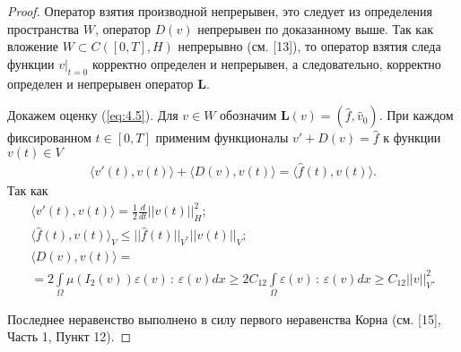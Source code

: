 \documentclass[14pt, a4paper]{extarticle}
\numberwithin{equation}{section}
\begin{document}
    \begin{proof}
        Оператор взятия производной непрерывен, это следует из определения пространства $W$, оператор $D(v)$
        непрерывен по доказанному выше. Так как вложение $W \subset C([0,T], H)$
        непрерывно (см. [13]), то оператор взятия следа функции $v|_{t=0}$ корректно
        определен и непрерывен, а следовательно, корректно определен и непрерывен оператор $\boldsymbol{L}$.

        Докажем оценку (\ref{eq:4.5}). Для $v \in W$ обозначим $\boldsymbol{L}(v) = (\hat{f}, \hat{v}_0)$.
        При каждом фиксированном $t \in [0, T]$ применим функционалы $v' + D(v) = \hat{f}$ к функции $v(t) \in V$
        \begin{equation*}
            \begin{gathered}
                \langle v'(t), v(t) \rangle + \langle D(v), v(t) \rangle = \langle \hat{f}(t), v(t) \rangle.
            \end{gathered}
        \end{equation*}
        Так как
        \begin{equation*}
            \begin{gathered}
                \langle v'(t), v(t) \rangle = \frac{1}{2} \frac{d}{dt}||v(t)||^2_H;\\
                \langle \hat{f}(t), v(t) \rangle_V \leq ||\hat{f}(t)||_{V^*}||v(t)||_V;\\
                \langle D(v), v(t) \rangle = \\ = 2\int\limits_\Omega \mu(I_2(v))\varepsilon(v)\, : \,\varepsilon(v)dx
                \geq 2C_{12} \int\limits_\Omega \varepsilon(v)\, : \,\varepsilon(v)dx \geq C_{12}||v||_V^2.
            \end{gathered}
        \end{equation*}

        Последнее неравенство выполнено в силу первого неравенства Корна (см. [15], Часть 1, Пункт 12).


\end{proof}
\end{document}
